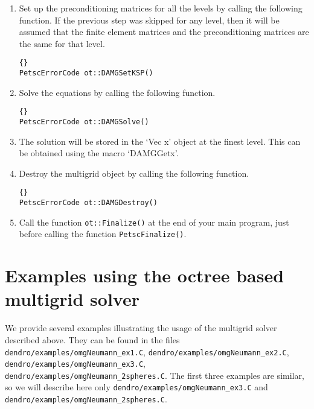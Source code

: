 \documentclass[10pt,reqno,a4paper]{report}
\numberwithin{equation}{section}
\begin{document}
\begin{enumerate}
\item Set up the preconditioning matrices for all the levels by calling the following function. If the previous step was skipped for any level, then it will be assumed that the finite element matrices and the preconditioning matrices are the same for that level.

\begin{lstlisting}[frame=trbl]{}
PetscErrorCode ot::DAMGSetKSP()
\end{lstlisting}

\item Solve the equations by calling the following function.

\begin{lstlisting}[frame=trbl]{}
PetscErrorCode ot::DAMGSolve()
\end{lstlisting}

\item The solution will be stored in the `Vec x' object at the finest level. This can be obtained using the macro `DAMGGetx'.
  
\item Destroy the multigrid object by calling the following function.

\begin{lstlisting}[frame=trbl]{}
PetscErrorCode ot::DAMGDestroy()
\end{lstlisting}

\item Call the function \lstinline[basicstyle=\bfseries]!ot::Finalize()! at the end of your main program, just before calling the function  \lstinline[basicstyle=\bfseries]!PetscFinalize()!.

\end{enumerate}


\section{Examples using the octree based multigrid solver}
We provide several examples illustrating the usage of the multigrid solver described above. They can be found in the files
\verb'dendro/examples/omgNeumann_ex1.C', 
\verb'dendro/examples/omgNeumann_ex2.C',
\verb'dendro/examples/omgNeumann_ex3.C',
\verb'dendro/examples/omgNeumann_2spheres.C'.
The first three examples are similar, so we will describe here only  \verb'dendro/examples/omgNeumann_ex3.C' and \verb'dendro/examples/omgNeumann_2spheres.C'.
\end{document}

